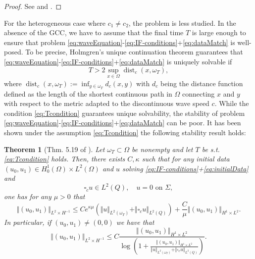 \documentclass[sn-mathphys-num]{sn-jnl}
\newtheorem{thm}{Theorem}[section]
\numberwithin{equation}{section}
\newcommand{\wop}{\square_c}
\begin{document}
\begin{proof}
    See \cite[Thm. A.4]{BFMO21control} and \cite[Rem. A.5]{BFMO21control}.
\end{proof}

\noindent For the heterogeneous case where $c_1 \not =  c_2$, the problem is less studied. In the absence of the GCC, we have to assume that the final time $T$ is large enough to ensure that problem \eqref{eq:waveEquation}-\eqref{eq:IF-conditions}+\eqref{eq:dataMatch} is well-posed. To be precise, Holmgren's unique continuation theorem guarantees that \eqref{eq:waveEquation}-\eqref{eq:IF-conditions}+\eqref{eq:dataMatch} is uniquely solvable if
\begin{equation}\label{eq:Tcondition}
    T > 2 \sup_{x \in \Omega} \operatorname{dist}_{c}(x,\omega_T),
\end{equation}
where $\operatorname{dist}_c(x,\omega_T) := \inf_{y \in \omega_T} d_c(x,y)$ with $d_c$ being the distance function defined as the length of the shortest continuous path in $\Omega$ connecting $x$ and $y$ with respect to the metric adapted to the discontinuous wave speed $c$. While the condition \eqref{eq:Tcondition} guarantees unique solvability, the stability of problem \eqref{eq:waveEquation}-\eqref{eq:IF-conditions}+\eqref{eq:dataMatch} can be poor. It has been shown \cite[Thm. 5.19]{Filippas22} under the assumption \eqref{eq:Tcondition} the following stability result holds:  
\begin{thm}[Thm. 5.19 of \cite{Filippas22}]\label{thm:filippas}
    Let $\omega_T \subset \Omega$ be nonempty and let $T$ be s.t. \eqref{eq:Tcondition} holds. Then, there exists $C,\kappa$ such that for any initial data $(u_0,u_1) \in H^1_0(\Omega) \times L^2(\Omega)$ and $u$ solving \eqref{eq:IF-conditions}+\eqref{eq:initialData} and  
\[
\wop u \in L^2(Q), \quad u = 0 \text{ on } \Sigma,
\]
one has for any $\mu > 0$ that 
    \begin{equation}\label{eq:FilippasEstimate}
        \Vert (u_0,u_1) \Vert_{L^2 \times H^{-1}} \le C e^{\kappa \mu} \left( \Vert u \Vert_{L^2(\omega_T)} + \Vert \wop u \Vert_{L^2(Q)} \right) + \frac{C}{\mu} \Vert (u_0,u_1) \Vert_{H^1 \times L^2}. 
    \end{equation}
    In particular, if $(u_0,u_1) \not = (0,0)$ we have that 
    \begin{equation}\label{eq:FilippasEstimateLog}
        \Vert (u_0,u_1) \Vert_{L^2 \times H^{-1}} \le C \frac{\Vert (u_0,u_1) \Vert_{H^1 \times L^2}}{\log \left( 1 + \frac{\Vert (u_0,u_1) \Vert_{H^1 \times L^2}}{ \Vert u \Vert_{L^2(\omega_T)} + \Vert \wop u \Vert_{L^2(Q)}} \right)}. 
    \end{equation} 
\end{thm} 
\end{document}
